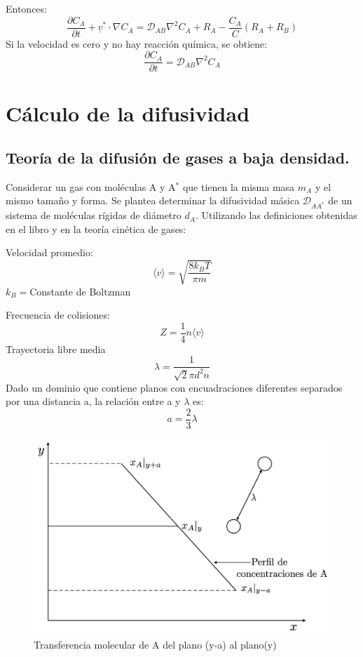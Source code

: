  Entonces:
 \begin{equation}
 	\frac{\partial C_A}{\partial t} + \underline{v}^* \cdot\nabla C_A=\mathscr{D}_{AB} \nabla^2 C_A+R_A-\frac{C_A}{C}(R_A+R_B) \tag{1.32}\label{eq_1.32}
 \end{equation}
 Si la velocidad es cero y no hay reacción química, se obtiene:
  \begin{equation}
 	\frac{\partial C_A}{\partial t}=\mathscr{D}_{AB} \nabla^2 C_A \tag{1.33}\label{eq_1.33}
 	\end{equation}
 	
 \section{Cálculo de la difusividad}
 \subsection{Teoría de la difusión de gases a baja densidad.}
 		Considerar un gas con moléculas A y A$^*$	que tienen la misma masa $m_A$
 		y el mismo tamaño y forma. Se plantea determinar la difusividad másica $\mathscr{D}_{AA^*}$
 		de un sistema de moléculas rígidas de diámetro $d_A$. Utilizando las definiciones obtenidas en el libro y en la teoría cinética de gases:
 	
 	Velocidad promedio:
 		\begin{equation}
 			\langle v \rangle = \sqrt{\frac{8k_B	T}{\pi m}}  \tag{1.34}\label{eq_1.34}
 		\end{equation}
 		$k_B=$Constante de Boltzman
 	
 	Frecuencia de colisiones:
 		\begin{equation}
 			Z = \frac{1}{4} n \langle v \rangle  \tag{1.35}\label{eq_1.35}
 		\end{equation}
 		Trayectoria libre media
 		\begin{equation}
 			\lambda = \frac{1}{\sqrt{2} \pi d^2 n}  \tag{1.36}\label{eq_1.36}
 		\end{equation}
 		Dado un dominio que contiene planos con encuadraciones diferentes separados por una distancia a, la relación entre a y $\lambda$ es:
 		 		\begin{equation}
 		 			a=\frac{2}{3} \lambda \tag{1.37}\label{eq_1.37}
 		 			\end{equation}
        \begin{figure}[h]

        \centering\includegraphics[width=0.6\linewidth]{Capitulo1/Imagenes/Fig_1.1.jpeg}
        \caption{Transferencia molecular de A del plano (y-a) al plano(y)}
        \label{fig:Fig_1.1}

\end{figure}

